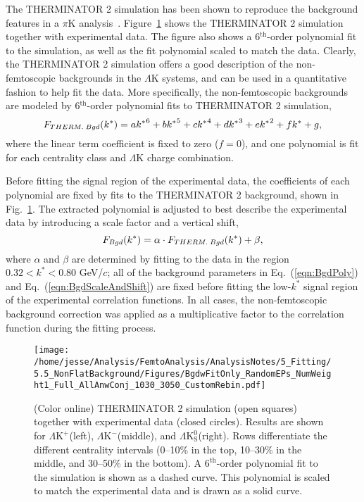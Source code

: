 \documentclass[ALICE,manyauthors]{cernphprep}
\newcommand{\kstar}{$k^{*}$\xspace}
\newcommand{\LamK}{$\Lambda$K\xspace}
\newcommand{\LamKchP}{$\Lambda\mathrm{K^{+}}$\xspace}
\newcommand{\LamKchM}{$\Lambda\mathrm{K^{-}}$\xspace}
\newcommand{\LamKs}{$\Lambda\mathrm{K^{0}_{S}}$\xspace}
\begin{document}
The THERMINATOR 2 simulation has been shown to reproduce the background features in a $\pi$K analysis~\cite{Kisiel:2017}. 
Figure~\ref{fig:BgdswTHERM} shows the THERMINATOR 2 simulation together with experimental data.  
The figure also shows a 6$^{\mathrm{th}}$-order polynomial fit to the simulation, as well as the fit polynomial scaled to match the data.
Clearly, the THERMINATOR 2 simulation offers a good description of the non-femtoscopic backgrounds in the \LamK systems, and can be used in a quantitative fashion to help fit the data.
More specifically, the non-femtoscopic backgrounds are modeled by 6$^{\mathrm{th}}$-order polynomial fits to THERMINATOR 2 simulation,
\begin{equation}
F_{\scaleto{THERM.\; Bgd}{6pt}}(k^{*}) = a{k^{*}}^{6}+ b{k^{*}}^{5} + c{k^{*}}^{4} + d{k^{*}}^{3} + e{k^{*}}^{2} + fk^{*} + g,
\label{eqn:BgdPoly}
\end{equation}
where the linear term coefficient is fixed to zero ($f=0$), and one polynomial is fit for each centrality class and \LamK charge combination.

Before fitting the signal region of the experimental data, the coefficients of each polynomial are fixed by fits to the THERMINATOR 2 background, shown in Fig.~\ref{fig:BgdswTHERM}.
The extracted polynomial is adjusted to best describe the experimental data by introducing a scale factor and a vertical shift,
\begin{equation}
F_{\scaleto{Bgd}{6pt}}(k^{*}) = \alpha\cdot F_{\scaleto{THERM.\; Bgd}{6pt}}(k^{*}) + \beta,
\label{eqn:BgdScaleAndShift}
\end{equation}
where $\alpha$ and $\beta$ are determined by fitting to the data in the region $0.32 < k^{*} < 0.80$ GeV/$c$; all of the background parameters in Eq.~(\ref{eqn:BgdPoly}) and Eq.~(\ref{eqn:BgdScaleAndShift}) are fixed before fitting the low-\kstar signal region of the experimental correlation functions.
In all cases, the non-femtoscopic background correction was applied as a multiplicative factor to the correlation function during the fitting process.


\begin{figure}[h]
  \centering
  \texttt{[image: /home/jesse/Analysis/FemtoAnalysis/AnalysisNotes/5\_Fitting/5.5\_NonFlatBackground/Figures/BgdwFitOnly\_RandomEPs\_NumWeight1\_Full\_AllAnwConj\_1030\_3050\_CustomRebin.pdf]}
  \caption[Backgrounds with THERMINATOR 2]
  {
  (Color online) THERMINATOR 2 simulation (open squares) together with experimental data (closed circles).  
  Results are shown for \LamKchP (left), \LamKchM (middle), and \LamKs (right).
  Rows differentiate the different centrality intervals (0--10\% in the top, 10--30\% in the middle, and 30--50\% in the bottom).
  A $6^{\mathrm{th}}$-order polynomial fit to the simulation is shown as a dashed curve.  
  This polynomial is scaled to match the experimental data and is drawn as a solid curve.
  }
  \label{fig:BgdswTHERM}
\end{figure} 
\end{document}
